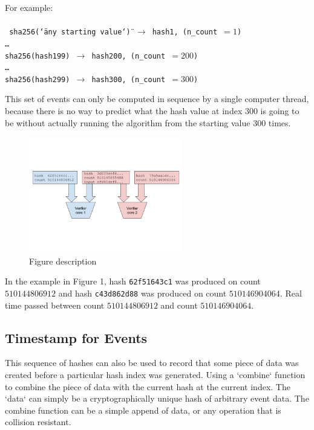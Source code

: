 \documentclass[12pt]{article}
\begin{document}
\noindent For example:\\\\\noindent
\texttt{
 sha256(\char`\"any starting value\char`\") $\rightarrow$ hash1, (n\_count~$=1$)\\
\ldots\\
sha256(hash199) $\rightarrow$ hash200, (n\_count~$=200$)\\
\ldots\\
sha256(hash299) $\rightarrow$ hash300, (n\_count~$=300$)\\
}

This set of events can only be computed in sequence by a single computer thread, because there is no way to predict what the hash value at index $300$ is going to be without actually running the algorithm from the starting value $300$ times.

\begin{figure}
  \begin{center}
    \centering
    \includegraphics[width=0.6\textwidth]{figures/fig_2.png}
    \caption[Fig 2]{Figure description \label{fig_2}}
  \end{center}
  \end{figure}
In the example in Figure 1, hash \texttt{62f51643c1} was produced on
count $510144806912$ and hash \texttt{c43d862d88} was produced on
count $510146904064$. Real time passed between count $510144806912$
and count $510146904064$.

\subsection{Timestamp for Events}

This sequence of hashes can also be used to record that some piece of data was created before a particular hash index was generated.  Using a `combine` function to combine the piece of data with the current hash at the current index. The `data` can simply be a cryptographically unique hash of arbitrary event data. The combine function can be a simple append of data, or any operation that is collision resistant.\\
\end{document}
